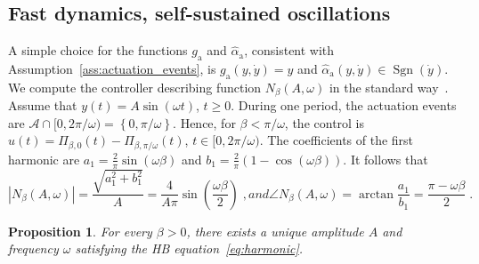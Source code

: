 \documentclass{article}
\newcommand{\AC}{\mathcal{A}}
\newcommand{\ra}{\mathrm{a}}
\newcommand{\rd}{\mathrm{d}}
\DeclareMathOperator{\sgn}{Sgn}
\newtheorem{proposition}{Proposition}
\theoremstyle{definition}
\theoremstyle{remark}
\begin{document}
\subsection{Fast dynamics, self-sustained oscillations}

A simple choice for the functions $g_\ra$ and $\hat{\alpha}_\ra$, consistent with Assumption~\ref{ass:actuation_events}, is $g_\ra(y,\dot{y}) = y$ and $\hat{\alpha}_\ra(y,\dot{y}) \in \sgn(\dot{y})$. We compute the controller describing function $N_\beta(A,\omega)$ in the standard way~\cite{gelb}. Assume that $y(t) = A\sin(\omega t)$, $t \ge 0$. During one period, the actuation events are $\AC \cap [0,2\pi/\omega) = \left\{0, \pi/\omega\right\}$. Hence, for $\beta < \pi/\omega$, the control is $u(t) = \Pi_{\beta,0}(t) - \Pi_{\beta,\pi/\omega}(t)$, $t \in [0,2\pi/\omega)$. The coefficients of the first harmonic are $a_1 = \frac{2}{\pi}\sin(\omega \beta)$ and $b_1 = \frac{2}{\pi}\left(1 - \cos(\omega \beta)\right)$.
It follows that
\begin{subequations} \label{eq:N}
\begin{equation} \label{eq:N_amp}
    |N_\beta(A,\omega)| = \frac{\sqrt{a_1^2+b_1^2}}{A} = \frac{4}{A \pi}\sin\left(\frac{\omega \beta}{2}\right) \;,
\end{equation}
and
\begin{equation} \label{eq:N_ang}
    \angle N_\beta(A,\omega) = \arctan \frac{a_1}{b_1} = \frac{\pi-\omega \beta}{2} \;. 
\end{equation}
\end{subequations}

\begin{proposition} \label{prop:unique}
    For every $\beta > 0$, there exists a unique amplitude $A$ and frequency $\omega$ satisfying the HB equation~\eqref{eq:harmonic}.
\end{proposition}
\end{document}
